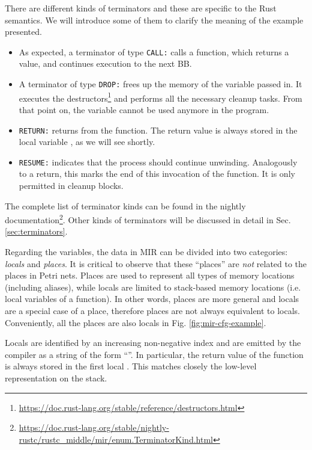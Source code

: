 There are different kinds of terminators and these are specific to the Rust semantics.
We will introduce some of them to clarify the meaning of the example presented.

\begin{itemize}
    \item As expected, a terminator of type \texttt{CALL:} calls a function, which returns a value,
          and continues execution to the next \acrshort{BB}.
    \item A terminator of type \texttt{DROP:} frees up the memory of the variable passed in.
          It executes the destructors\footnote{\url{https://doc.rust-lang.org/stable/reference/destructors.html}}
          and performs all the necessary cleanup tasks.
          From that point on, the variable cannot be used anymore in the program.
    \item \texttt{RETURN:} returns from the function.
          The return value is always stored in the local variable , as we will see shortly.
    \item \texttt{RESUME:} indicates that the process should continue unwinding.
          Analogously to a return, this marks the end of this invocation of the function.
          It is only permitted in cleanup blocks.
\end{itemize}

The complete list of terminator kinds can be found in the nightly
documentation\footnote{\url{https://doc.rust-lang.org/stable/nightly-rustc/rustc_middle/mir/enum.TerminatorKind.html}}.
Other kinds of terminators will be discussed in detail in Sec. \ref{sec:terminators}.

Regarding the variables, the data in MIR can be divided into two categories:
\emph{locals} and \emph{places}.
It is critical to observe that these ``places'' are
\emph{not} related to the places in Petri nets.
Places are used to represent all types of memory locations (including aliases),
while locals are limited to stack-based memory locations
(i.e. local variables of a function).
In other words, places are more general and locals are a special case of a place,
therefore places are not always equivalent to locals.
Conveniently, all the places are also locals in Fig. \ref{fig:mir-cfg-example}.

Locals are identified by an increasing non-negative index
and are emitted by the compiler as a string of the form ``''.
In particular, the return value of the function
is always stored in the first local .
This matches closely the low-level representation on the stack.

